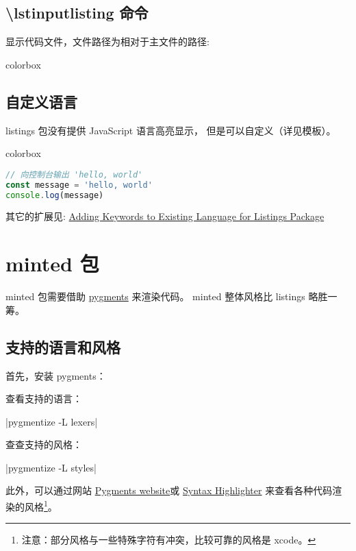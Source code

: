 \subsection{{\ttfamily \textbackslash lstinputlisting} 命令}

显示代码文件，文件路径为相对于主文件的路径:

\begin{latexcode}{colorbox}

\end{latexcode}

\subsection{自定义语言}

listings 包没有提供 JavaScript 语言高亮显示， 但是可以自定义（详见模板）。

\begin{latexcode}{colorbox}
\begin{lstlisting}[language=js,caption={JavaScript 语言}]
// 向控制台输出 'hello, world'
const message = 'hello, world'
console.log(message)
\end{lstlisting}
\end{latexcode}

其它的扩展见:
\href{https://tex.stackexchange.com/questions/224093/adding-keywords-to-existing-language-for-listings-package}{Adding Keywords to Existing Language for Listings Package}

\section{minted 包}

minted 包需要借助 \href{https://pygments.org/}{pygments} 来渲染代码。
minted 整体风格比 listings 略胜一筹。

\subsection{支持的语言和风格}

首先，安装 pygments：


查看支持的语言：

|pygmentize -L lexers|

查查支持的风格：

|pygmentize -L styles|

此外，可以通过网站
\href{https://pygments.org/demo/}{Pygments website}或
\href{https://thepythonguru.com/tools/pygments-demo/}{Syntax Highlighter}
来查看各种代码渲染的风格\footnote{注意：部分风格与一些特殊字符有冲突，比较可靠的风格是 xcode。}。


